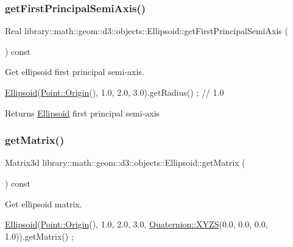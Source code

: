 \subsubsection{\texorpdfstring{get\+First\+Principal\+Semi\+Axis()}{getFirstPrincipalSemiAxis()}}
{\footnotesize\ttfamily Real library\+::math\+::geom\+::d3\+::objects\+::\+Ellipsoid\+::get\+First\+Principal\+Semi\+Axis (\begin{DoxyParamCaption}{ }\end{DoxyParamCaption}) const}



Get ellipsoid first principal semi-\/axis. 


\begin{DoxyCode}
\hyperlink{classlibrary_1_1math_1_1geom_1_1d3_1_1objects_1_1_ellipsoid_aae81fe0edc7f0e8d4590ea89ae73cb14}{Ellipsoid}(\hyperlink{classlibrary_1_1math_1_1geom_1_1d3_1_1objects_1_1_point_ab2a38e285c562e50bf350272c083986f}{Point::Origin}(), 1.0, 2.0, 3.0).getRadius() ; \textcolor{comment}{// 1.0}
\end{DoxyCode}


\begin{DoxyReturn}{Returns}
\hyperlink{classlibrary_1_1math_1_1geom_1_1d3_1_1objects_1_1_ellipsoid}{Ellipsoid} first principal semi-\/axis 
\end{DoxyReturn}
\mbox{\label{classlibrary_1_1math_1_1geom_1_1d3_1_1objects_1_1_ellipsoid_ae6af9f16762e8c38b0a71c306d29ddbf}} 
\subsubsection{\texorpdfstring{get\+Matrix()}{getMatrix()}}
{\footnotesize\ttfamily Matrix3d library\+::math\+::geom\+::d3\+::objects\+::\+Ellipsoid\+::get\+Matrix (\begin{DoxyParamCaption}{ }\end{DoxyParamCaption}) const}



Get ellipsoid matrix. 


\begin{DoxyCode}
\hyperlink{classlibrary_1_1math_1_1geom_1_1d3_1_1objects_1_1_ellipsoid_aae81fe0edc7f0e8d4590ea89ae73cb14}{Ellipsoid}(\hyperlink{classlibrary_1_1math_1_1geom_1_1d3_1_1objects_1_1_point_ab2a38e285c562e50bf350272c083986f}{Point::Origin}(), 1.0, 2.0, 3.0, \hyperlink{classlibrary_1_1math_1_1geom_1_1trf_1_1rot_1_1_quaternion_afff9523c7dcbfbbc521736121e62ad41}{Quaternion::XYZS}(0.0, 0.0, 
      0.0, 1.0)).getMatrix() ;
\end{DoxyCode}


